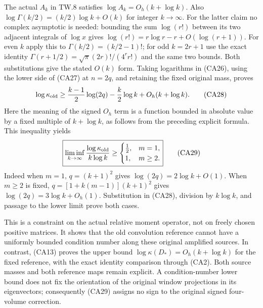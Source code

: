 The actual $A_k$ in TW.8 satisfies $\log A_k=O_h(k+\log k)$.
Also $\log\Gamma(k/2)=(k/2)\log k+O(k)$ for integer $k\to\infty$.
For the latter claim no complex asymptotic is needed: bounding the
sum $\log(r!)$ between its two adjacent integrals of $\log x$ gives
$\log(r!)=r\log r-r+O(\log(r+1))$.  For even $k$ apply this to
$\Gamma(k/2)=(k/2-1)!$; for odd $k=2r+1$ use the exact identity
$\Gamma(r+1/2)=\sqrt\pi(2r)!/(4^r r!)$ and the same two bounds.
Both substitutions give the stated $O(k)$ form.
Taking logarithms in (CA26), using the lower side of (CA27) at $n=2q$,
and retaining the fixed original mass, proves
\[
 \log\kappa_{\rm old}\ge
 \frac{k-1}{2}\log(2q)-\frac k2\log k+O_h(k+\log k).
 \tag{CA28}
\]
Here the meaning of the signed $O_h$ term is a function bounded in
absolute value by a fixed multiple of $k+\log k$, as follows from the
preceding explicit formula.  This inequality yields
\[
 \boxed{
 \liminf_{k\to\infty}\frac{\log\kappa_{\rm old}}{k\log k}
 \ge\begin{cases}\tfrac12,&m=1,\\1,&m\ge2.\end{cases}}
 \tag{CA29}
\]
Indeed when $m=1$, $q=(k+1)^2$ gives $\log(2q)=2\log k+O(1)$.
When $m\ge2$ is fixed,
$q=[1+k(m-1)](k+1)^2$ gives $\log(2q)=3\log k+O_h(1)$.
Substitution in (CA28), division by $k\log k$, and passage to the
lower limit prove both cases.

This is a constraint on the actual relative moment operator, not on
freely chosen positive matrices.  It shows that the old convolution
reference cannot have a uniformly bounded condition number along these
original amplified sources.  In contrast, (CA13) proves the upper bound
$\log\kappa(D_*)=O_h(k+\log k)$ for the fixed reference, with the exact
identity comparison through (CA2).  Both source masses and both reference
maps remain explicit.  A condition-number lower bound does not fix the
orientation of the original window projections in its eigenvectors;
consequently (CA29) assigns no sign to the original signed four-volume
correction.
